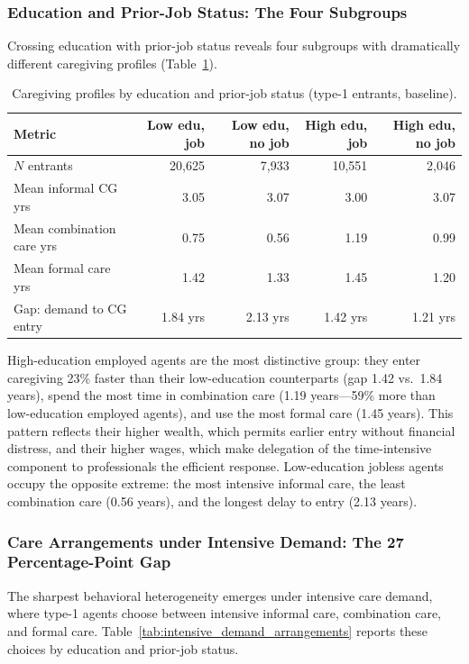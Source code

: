 \subsubsection{Education and Prior-Job Status: The Four Subgroups}

Crossing education with prior-job status reveals four subgroups with dramatically different caregiving profiles (Table~\ref{tab:four_subgroups}).

\begin{table}[htbp]
  \centering
  \caption{Caregiving profiles by education and prior-job status (type-1 entrants, baseline).}
  \label{tab:four_subgroups}
  \small
  \begin{tabular}{lrrrr}
    \toprule
    Metric & Low edu, job & Low edu, no job & High edu, job & High edu, no job \\
    \midrule
    $N$ entrants & 20,625 & 7,933 & 10,551 & 2,046 \\
    Mean informal CG yrs & 3.05 & 3.07 & 3.00 & 3.07 \\
    Mean combination care yrs & 0.75 & 0.56 & 1.19 & 0.99 \\
    Mean formal care yrs & 1.42 & 1.33 & 1.45 & 1.20 \\
    Gap: demand to CG entry & 1.84 yrs & 2.13 yrs & 1.42 yrs & 1.21 yrs \\
    \bottomrule
  \end{tabular}
\end{table}

High-education employed agents are the most distinctive group: they enter caregiving 23\% faster than their low-education counterparts (gap 1.42 vs.\ 1.84 years), spend the most time in combination care (1.19 years---59\% more than low-education employed agents), and use the most formal care (1.45 years). This pattern reflects their higher wealth, which permits earlier entry without financial distress, and their higher wages, which make delegation of the time-intensive component to professionals the efficient response. Low-education jobless agents occupy the opposite extreme: the most intensive informal care, the least combination care (0.56 years), and the longest delay to entry (2.13 years).

\subsubsection{Care Arrangements under Intensive Demand: The 27 Percentage-Point Gap}

The sharpest behavioral heterogeneity emerges under intensive care demand, where type-1 agents choose between intensive informal care, combination care, and formal care. Table~\ref{tab:intensive_demand_arrangements} reports these choices by education and prior-job status.


